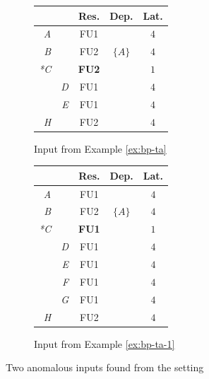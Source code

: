 \begin{figure}
    \centering
    \begin{subfigure}[b]{0.45\textwidth}
        \centering
        \begin{tabular}{rr|ccc}
            &  & Res. & Dep. & Lat. \\ \hline
            \textit{A} &  & FU1 &  & $4$ \\
            \textit{B} &  & FU2 & $\{A\}$ & $4$ \\
            \textit{*C} &  & \textbf{FU2} &  & $1$ \\
            & \textit{D} & FU1 &  & $4$ \\
            & \textit{E} & FU1 &  & $4$ \\
            \textit{H} &  & FU2 &  & $4$ \\
        \end{tabular}
        \caption{Input from Example \ref{ex:bp-ta}}
        \label{fig:bp-ta-inputs-0}
    \end{subfigure}
    \hfill
    \begin{subfigure}[b]{0.45\textwidth}
        \centering
        
        \begin{tabular}{rr|ccc}
            &  & Res. & Dep. & Lat. \\ \hline
            \textit{A} &  & FU1 &  & $4$ \\
            \textit{B} &  & FU2 & $\{A\}$ & $4$ \\
            \textit{*C} &  & \textbf{FU1} &  & $1$ \\
            & \textit{D} & FU1 &  & $4$ \\
            & \textit{E} & FU1 &  & $4$ \\
            & \textit{F} & FU1 &  & $4$ \\
            & \textit{G} & FU1 &  & $4$ \\
            \textit{H} &  & FU2 &  & $4$ \\
        \end{tabular}
        \caption{Input from Example \ref{ex:bp-ta-1}}
        \label{fig:bp-ta-inputs-1}
    \end{subfigure}
    \caption{Two anomalous inputs found from the setting}
    \label{fig:bp-ta-inputs}
\end{figure}



